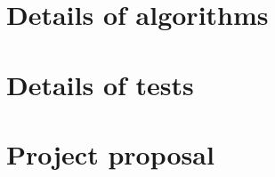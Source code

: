 \documentclass[12pt,a4paper,twoside,notitlepage]{report}
\theoremstyle{plain}
\theoremstyle{definition}
\theoremstyle{remark}
\begin{document}
\chapter{Details of algorithms} \label{appendix:impl}


\chapter{Details of tests} \label{appendix:test}


\chapter{Project proposal} \label{appendix:proposal}

\end{document}
